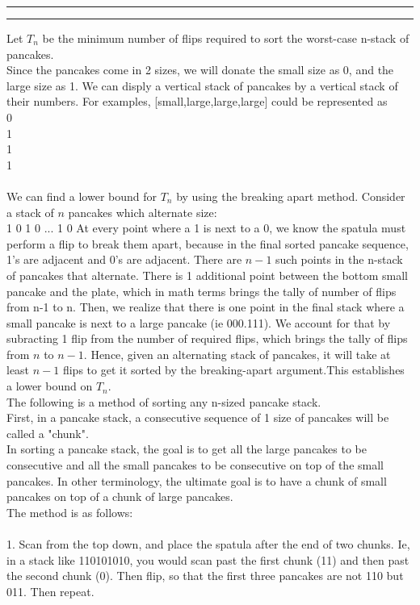 \documentclass[11pt,letterpaper]{article}
\newcommand{\question}[2] {\vspace{.25in} \hrule\vspace{0.5em}
\noindent{\bf #1: #2} \vspace{0.5em}
\hrule \vspace{.10in}}
\begin{document}
\question{4}{Post Puzzle Pancake Party}
Let $T_n$ be the minimum number of flips required to sort the worst-case n-stack of pancakes.\\
Since the pancakes come in 2 sizes, we will donate the small size as 0, and the large size as 1. We can disply a vertical stack of pancakes by a vertical stack of their numbers. For examples, [small,large,large,large] could be represented as \\
0\\
1\\
1\\
1\\
\\
We can find a lower bound for $T_n$ by using the breaking apart method. Consider a stack of $n$ pancakes which alternate size:\\
1
0
1
0
...
1
0
At every point where a 1 is next to a 0, we know the spatula must perform a flip to break them apart, because in the final sorted pancake sequence, 1's are adjacent and 0's are adjacent. There are $n-1$ such points in the n-stack of pancakes that alternate. There is 1 additional point between the bottom small pancake and the plate, which in math terms brings the tally of number of flips from n-1 to n. Then, we realize that there is one point in the final stack where a small pancake is next to a large pancake (ie 000.111). We account for that by subracting 1 flip from the number of required flips, which brings the tally of flips from $n$ to $n-1$. Hence, given an alternating stack of pancakes, it will take at least $n-1$ flips to get it sorted by the breaking-apart argument.This establishes a lower bound on $T_n$.
\\
The following is a method of sorting any n-sized pancake stack.\\
First, in a pancake stack, a consecutive sequence of 1 size of pancakes will be called a "chunk".\\
In sorting a pancake stack, the goal is to get all the large pancakes to be consecutive and all the small pancakes to be consecutive on top of the small pancakes. In other terminology, the ultimate goal is to have a chunk of small pancakes on top of a chunk of large pancakes.\\
The method is as follows:\\
\\
1. Scan from the top down, and place the spatula after the end of two chunks. Ie, in a stack like 110101010, you would scan past the first chunk (11) and then past the second chunk (0). Then flip, so that the first three pancakes are not 110 but 011. Then repeat.\\
\end{document}
